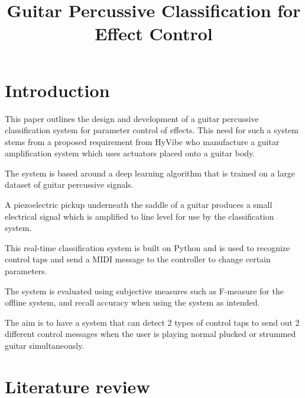 \documentclass[conference]{IEEEtran}
\begin{document}
\title{Guitar Percussive Classification for Effect Control\\

}

\author{
}

\maketitle

\begin{abstract}

\end{abstract}
 
 



\section{Introduction}
This paper outlines the design and development of a guitar percussive classification system for parameter control of effects. This need for such a system stems from a proposed
requirement from HyVibe who manufacture a guitar amplification system which uses actuators placed onto a guitar body.

The system is based around a deep learning algorithm that is trained on a large dataset of guitar percussive signals. 

A piezoelectric pickup underneath the saddle of a guitar produces a small electrical signal which is amplified to line level for use by the classification system.

This real-time classification system is built on Python and is used to recognize control taps and send a MIDI message to the controller to change certain parameters.

The system is evaluated using subjective measures such as F-measure for the offline system, and recall accuracy when using the system as intended.

The aim is to have a system that can detect 2 types of control taps to send out 2 different control messages when the user is playing normal plucked or strummed guitar simultaneously.


\section{Literature review}
\end{document}
